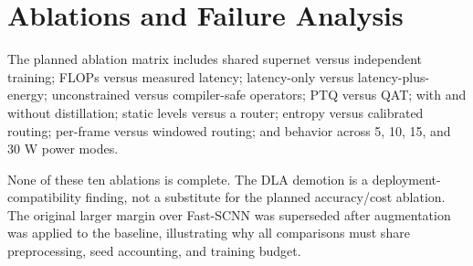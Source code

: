 \section{Ablations and Failure Analysis}
\label{sec:ablations}

The planned ablation matrix includes shared supernet versus independent training; FLOPs versus measured latency; latency-only versus latency-plus-energy; unconstrained versus compiler-safe operators; PTQ versus QAT; with and without distillation; static levels versus a router; entropy versus calibrated routing; per-frame versus windowed routing; and behavior across 5, 10, 15, and 30 W power modes.

None of these ten ablations is complete. The DLA demotion is a deployment-compatibility finding, not a substitute for the planned accuracy/cost ablation. The original larger margin over Fast-SCNN was superseded after augmentation was applied to the baseline, illustrating why all comparisons must share preprocessing, seed accounting, and training budget.

